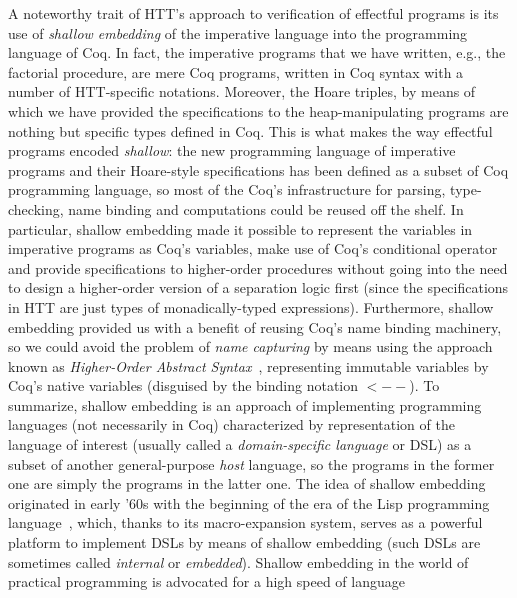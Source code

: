 \label{sec:shallowdeep}
A noteworthy trait of HTT's approach to verification of effectful
programs is its use of \textit{shallow embedding} of the imperative language
 into the programming language of Coq. In
fact, the imperative programs that we have written, e.g., the
factorial procedure, are mere Coq programs, written in Coq syntax with
a number of HTT-specific notations. Moreover, the Hoare triples, by
means of which we have provided the specifications to the
heap-manipulating programs are nothing but specific types defined in
Coq. This is what makes the way effectful programs encoded \textit{shallow}:
the new programming language of imperative programs and their
Hoare-style specifications has been defined as a subset of Coq
programming language, so most of the Coq's infrastructure for parsing,
type-checking, name binding and computations could be reused off the
shelf. In particular, shallow embedding made it possible to represent
the variables in imperative programs as Coq's variables, make use of
Coq's conditional operator and provide specifications to higher-order
procedures without going into the need to design a higher-order
version of a separation logic first (since the specifications in HTT
are just types of monadically-typed expressions). Furthermore, shallow
embedding provided us with a benefit of reusing Coq's name binding
machinery, so we could avoid the problem of \textit{name capturing} by means
using the approach known as \emph{Higher-Order Abstract
Syntax}~\cite{Pfenning-Elliott:PLDI88}, representing immutable
variables by Coq's native variables (disguised by the binding notation
$\mathtt{<--}$).
To summarize, shallow embedding is an approach of implementing
programming languages (not necessarily in Coq) characterized by
representation of the language of interest (usually called a
\textit{domain-specific language} or DSL) as a subset of another
general-purpose \textit{host} language, so the programs in the former one are
simply the programs in the latter one. The idea of shallow embedding
originated in early '60s with the beginning of the era of the Lisp
programming language~\cite{Graham:BOOK}, which, thanks
to its macro-expansion system, serves as a powerful platform to
implement DSLs by means of shallow embedding (such DSLs are sometimes
called \textit{internal} or \textit{embedded}). Shallow embedding in the world of
practical programming is advocated for a high speed of language
